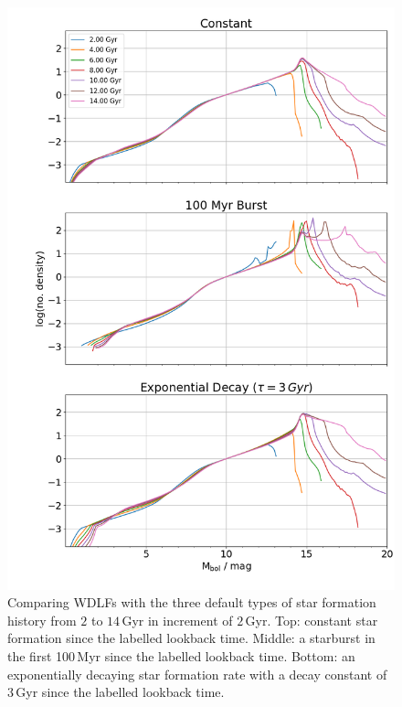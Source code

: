 \documentclass[fleqn,usenatbib]{rasti}
\begin{document}
\begin{figure}
    \centering
    \includegraphics[width=\columnwidth]{fig_08_wdlf_compare_sfr.png}
    \caption{Comparing WDLFs with the three default types of star formation
    history from $2$ to $14\,$Gyr in increment of $2$\,Gyr. Top: constant star
    formation since the labelled lookback time. Middle: a starburst in the 
    first 100\,Myr since the labelled lookback time. Bottom: an exponentially
    decaying star formation rate with a decay constant of 3\,Gyr since the
    labelled lookback time.}
    \label{fig:compare_sfr_age_type}
\end{figure}
\end{document}
